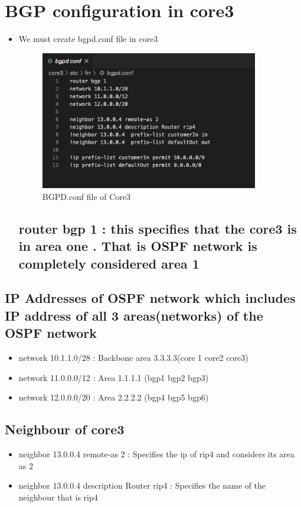 \section{BGP configuration in core3}
\begin{itemize}
    \item We must create bgpd.conf file in core3
    \begin{figure}[H]
\centering
  \includegraphics[width=0.9\textwidth]{Images/BGPD_core3.conf.png}
  \caption{BGPD.conf file of Core3}
  \label{fig }
\end{figure}
\subsection{ router bgp 1 : this specifies that the core3 is in area one . That is OSPF network is completely considered area 1}
\end{itemize}
\subsection{IP Addresses of OSPF network which includes IP address of all 3 areas(networks) of the OSPF network}
\begin{itemize}
\item network 10.1.1.0/28 : Backbone area 3.3.3.3(core 1 core2 core3)
\item network 11.0.0.0/12 : Area 1.1.1.1 (bgp1 bgp2 bgp3)
\item network 12.0.0.0/20 : Area 2.2.2.2 (bgp4 bgp5 bgp6)
\end{itemize}
\subsection{Neighbour of core3}
\begin{itemize}
\item neighbor 13.0.0.4 remote-as 2 : Specifies the ip of rip4 and considers its area as 2
\item neighbor 13.0.0.4 description Router rip4 : Specifies the name of the neighbour that is rip4
\end{itemize}
